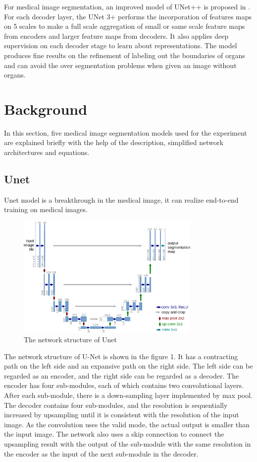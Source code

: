 \documentclass{article}
\begin{document}
For medical image segmentation, an improved model of UNet++ is proposed in \cite{huang2020unet}.
For each decoder layer, the UNet 3+ performs the incorporation of features maps on 5 scales to make a full scale aggregation of small or same scale feature maps from encoders and larger feature maps from decoders.
It also applies deep supervision on each decoder stage to learn about representations. The model produces fine results on the refinement of labeling out the boundaries of organs and can avoid the over segmentation problems when given an image without organs.

\section{Background}
In this section, five medical image segmentation models used for the experiment are explained briefly with the help of the description, simplified network architectures and equations.
\subsection{Unet}
Unet model is a breakthrough in the medical image, it can realize end-to-end training on medical images.

\begin{figure}[H]
    \centering
    \includegraphics[width = 3.5in]{Unet_model}
    \caption{The network structure of Unet}
    \label{The network structure of Unet}
\end{figure}

The network structure of U-Net is shown in the figure 1.
It has a contracting path on the left side and an expansive path on the right side. \cite{DBLP:journals/corr/RonnebergerFB15}
The left side can be regarded as an encoder, and the right side can be regarded as a decoder.
The encoder has four sub-modules, each of which contains two convolutional layers.
After each sub-module, there is a down-sampling layer implemented by max pool.
The decoder contains four sub-modules, and the resolution is sequentially increased by upsampling until it is consistent with the resolution of the input image.
As the convolution uses the valid mode, the actual output is smaller than the input image.
The network also uses a skip connection to connect the upsampling result with the output of the sub-module with the same resolution in the encoder as the input of the next sub-module in the decoder.
\end{document}
